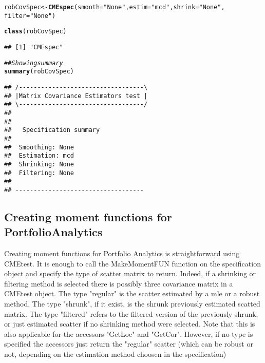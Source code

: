 \documentclass[12pt,letterpaper,english]{article}\usepackage[]{graphicx}\usepackage[]{color}
\makeatletter
\newcommand{\hlstr}[1]{\textcolor[rgb]{0.192,0.494,0.8}{#1}}%
\newcommand{\hlcom}[1]{\textcolor[rgb]{0.678,0.584,0.686}{\textit{#1}}}%
\newcommand{\hlstd}[1]{\textcolor[rgb]{0.345,0.345,0.345}{#1}}%
\newcommand{\hlkwb}[1]{\textcolor[rgb]{0.69,0.353,0.396}{#1}}%
\newcommand{\hlkwc}[1]{\textcolor[rgb]{0.333,0.667,0.333}{#1}}%
\newcommand{\hlkwd}[1]{\textcolor[rgb]{0.737,0.353,0.396}{\textbf{#1}}}%
\newenvironment{kframe}{%
 \def\at@end@of@kframe{}%
 \ifinner\ifhmode%
  \def\at@end@of@kframe{\end{minipage}}%
  \begin{minipage}{\columnwidth}%
 \fi\fi%
 \def\FrameCommand##1{\hskip\@totalleftmargin \hskip-\fboxsep
 \colorbox{shadecolor}{##1}\hskip-\fboxsep
     \hskip-\linewidth \hskip-\@totalleftmargin \hskip\columnwidth}%
 \MakeFramed {\advance\hsize-\width
   \@totalleftmargin\z@ \linewidth\hsize
   \@setminipage}}%
 {\par\unskip\endMakeFramed%
 \at@end@of@kframe}
\newenvironment{knitrout}{}{} %
\makeatother
\begin{document}
\begin{knitrout}
\color{fgcolor}\begin{kframe}
\begin{alltt}
\hlstd{robCovSpec} \hlkwb{<-} \hlkwd{CMEspec}\hlstd{(}\hlkwc{smooth} \hlstd{=} \hlstr{"None"}\hlstd{,} \hlkwc{estim} \hlstd{=} \hlstr{"mcd"}\hlstd{,} \hlkwc{shrink} \hlstd{=} \hlstr{"None"}\hlstd{,}
    \hlkwc{filter} \hlstd{=} \hlstr{"None"}\hlstd{)}

\hlkwd{class}\hlstd{(robCovSpec)}
\end{alltt}
\begin{verbatim}
## [1] "CMEspec"
\end{verbatim}
\begin{alltt}
\hlcom{## Showing summary}
\hlkwd{summary}\hlstd{(robCovSpec)}
\end{alltt}
\begin{verbatim}
## /----------------------------------\
## |Matrix Covariance Estimators test |
## \----------------------------------/
## 
## 
## 	 Specification summary
## 
## 	Smoothing: None
## 	Estimation: mcd
## 	Shrinking: None
## 	Filtering: None
## 
## -----------------------------------
\end{verbatim}
\end{kframe}
\end{knitrout}


\subsection{Creating moment functions for PortfolioAnalytics}

Creating moment functions for Portfolio Analytics is straightforward using CMEtest. It is enough to call the MakeMomentFUN function on the specification object and specify the type of scatter matrix to return. 
Indeed, if a shrinking or filtering method is selected there is possibly three covariance matrix in a CMEtest object. The type "regular" is the scatter estimated by a mle or a robust method. The type "shrunk", if it exist, is the shrunk previously estimated scatted matrix. The type "filtered" refers to the filtered version of the previously shrunk, or just estimated scatter if no shrinking method were selected. Note that this is also applicable for the accessors "GetLoc" and "GetCor". However, if no type is specified the accessors just return the "regular" scatter (which can be robust or not, depending on the estimation method choosen in the specification)
\end{document}
